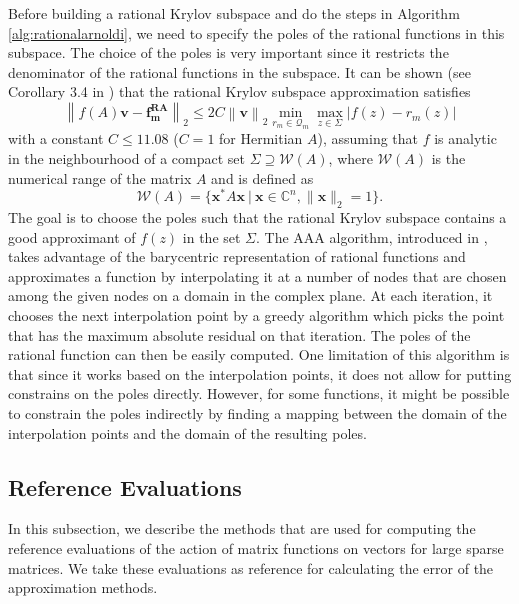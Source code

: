 Before building a rational Krylov subspace and do the steps in Algorithm \ref{alg:rationalarnoldi},
we need to specify the poles of the rational functions in this subspace.
The choice of the poles is very important since it restricts the denominator of the rational
functions in the subspace. It can be shown (see Corollary 3.4 in \cite{guttel2013rational}) that
the rational Krylov subspace approximation satisfies
\begin{equation*}
    \left\| f(A)\mathbf{v} - \mathbf{f_m^{RA}}  \right\|_2 \le 2 C \left\| \mathbf{v} \right\|_2
    \min_{r_m \in \mathcal{Q}_{m}} \max_{z \in \Sigma} | f(z) - r_m(z) |
\end{equation*}
with a constant $C \le 11.08$ ($C = 1$ for Hermitian $A$), assuming that $f$ is analytic in
the neighbourhood of a compact set $\Sigma \supseteq \mathcal{W}(A)$, where $\mathcal{W}(A)$
is the numerical range of the matrix $A$ and is defined as
\begin{equation}
    \label{eq:numericalrange}
    \mathcal{W}(A) = \{\mathbf{x^*} A \mathbf{x} \:|\: \mathbf{x} \in \mathbb{C}^{n}, \|\mathbf{x}\|_2=1\}.
\end{equation}
The goal is to choose the poles such that the rational Krylov subspace contains a good approximant
of $f(z)$ in the set $\Sigma$.
The AAA algorithm, introduced in \cite{nakatsukasa2018AAA}, takes advantage of the barycentric
representation of rational functions and approximates a function by interpolating it at a number
of nodes that are chosen among the given nodes on a domain in the complex plane.
At each iteration, it chooses the next interpolation point by a greedy algorithm which picks
the point that has the maximum absolute residual on that iteration. The poles of the rational
function can then be easily computed.
One limitation of this algorithm is that since it works based on the interpolation points,
it does not allow for putting constrains on the poles directly. However, for some functions,
it might be possible to constrain the poles indirectly by finding a mapping between the
domain of the interpolation points and the domain of the resulting poles.

\subsection{Reference Evaluations}
\label{sec:exactevaluation}

In this subsection, we describe the methods that are used for computing the reference
evaluations of the action of matrix functions on vectors for large sparse matrices.
We take these evaluations as reference for calculating the error of the approximation methods.

